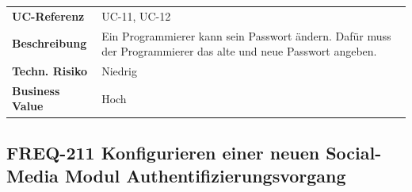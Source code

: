 \begin{longtable}[c]{@{}ll@{}}
\toprule
\begin{minipage}[t]{0.20\columnwidth}\raggedright\strut
\textbf{UC-Referenz}
\strut\end{minipage} &
\begin{minipage}[t]{0.74\columnwidth}\raggedright\strut
UC-11, UC-12
\strut\end{minipage}\tabularnewline
\begin{minipage}[t]{0.20\columnwidth}\raggedright\strut
\textbf{Beschreibung}
\strut\end{minipage} &
\begin{minipage}[t]{0.74\columnwidth}\raggedright\strut
Ein Programmierer kann sein Passwort ändern. Dafür muss der
Programmierer das alte und neue Passwort angeben.
\strut\end{minipage}\tabularnewline
\begin{minipage}[t]{0.20\columnwidth}\raggedright\strut
\textbf{Techn. Risiko}
\strut\end{minipage} &
\begin{minipage}[t]{0.74\columnwidth}\raggedright\strut
Niedrig
\strut\end{minipage}\tabularnewline
\begin{minipage}[t]{0.20\columnwidth}\raggedright\strut
\textbf{Business Value}
\strut\end{minipage} &
\begin{minipage}[t]{0.74\columnwidth}\raggedright\strut
Hoch
\strut\end{minipage}\tabularnewline
\bottomrule
\end{longtable}

\subsection{FREQ-211 Konfigurieren einer neuen Social-Media Modul
Authentifizierungsvorgang}\label{freq-211-konfigurieren-einer-neuen-social-media-modul-authentifizierungsvorgang}

